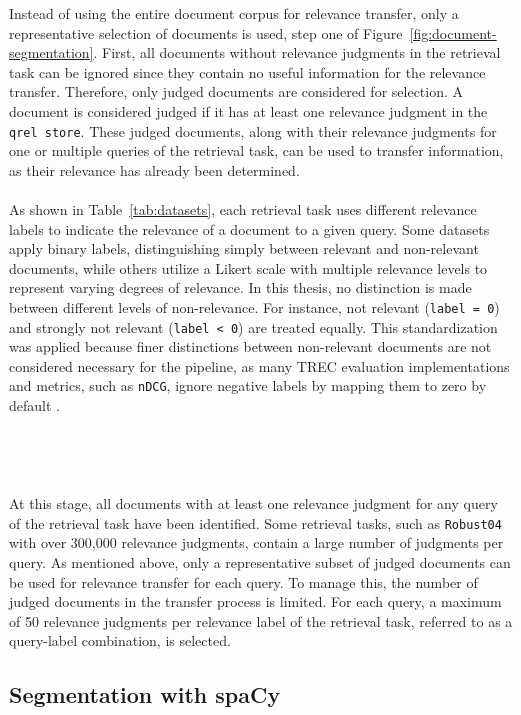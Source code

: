 Instead of using the entire document corpus for relevance transfer, only a representative selection of documents is used, step one of Figure~\ref{fig:document-segmentation}. First, all documents without relevance judgments in the retrieval task can be ignored since they contain no useful information for the relevance transfer. Therefore, only judged documents are considered for selection. A document is considered judged if it has at least one relevance judgment in the \texttt{qrel store}. These judged documents, along with their relevance judgments for one or multiple queries of the retrieval task, can be used to transfer information, as their relevance has already been determined.
\\\\
As shown in Table~\ref{tab:datasets}, each retrieval task uses different relevance labels to indicate the relevance of a document to a given query. Some datasets apply binary labels, distinguishing simply between relevant and non-relevant documents, while others utilize a Likert scale with multiple relevance levels to represent varying degrees of relevance. In this thesis, no distinction is made between different levels of non-relevance. For instance, \glqq not relevant\grqq{} \mbox{(\texttt{label = 0})} and \glqq strongly not relevant\grqq{} (\texttt{label < 0}) are treated equally. This standardization was applied because finer distinctions between non-relevant documents are not considered necessary for the pipeline, as many TREC evaluation implementations and metrics, such as \texttt{nDCG}, ignore negative labels by mapping them to zero by default \citep{gienapp:2020}.
\\\\\\\\\\
At this stage, all documents with at least one relevance judgment for any query of the retrieval task have been identified. Some retrieval tasks, such as \texttt{Robust04} with over 300,000 relevance judgments, contain a large number of judgments per query. As mentioned above, only a representative subset of judged documents can be used for relevance transfer for each query. To manage this, the number of judged documents in the transfer process is limited. For each query, a maximum of 50 relevance judgments per relevance label of the retrieval task, referred to as a query-label combination, is selected.

\subsection{Segmentation with spaCy}\label{segmentation-with-spacy}

